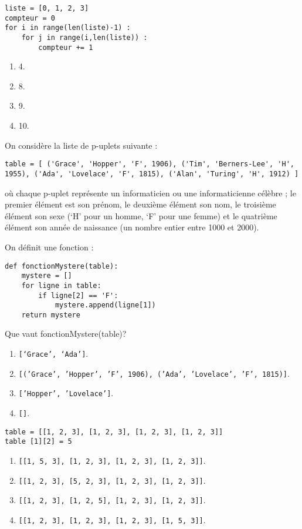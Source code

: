 \documentclass[t,10pt]{article}
\begin{document}
\begin{lstlisting}
liste = [0, 1, 2, 3]
compteur = 0
for i in range(len(liste)-1) :
    for j in range(i,len(liste)) :
        compteur += 1
\end{lstlisting}
\begin{enumerate}
\item 4.
\item 8.
\item 9. %
\item 10.
\end{enumerate}

\question{}
On considère la liste de p-uplets suivante :
\begin{lstlisting}
table = [ ('Grace', 'Hopper', 'F', 1906), ('Tim', 'Berners-Lee', 'H', 1955), ('Ada', 'Lovelace', 'F', 1815), ('Alan', 'Turing', 'H', 1912) ]
\end{lstlisting}
où chaque p-uplet représente un informaticien ou une informaticienne célèbre ; le premier élément est son prénom, le deuxième élément son nom, le troisième élément son sexe (‘H’ pour un homme, ‘F’ pour une femme) et le quatrième élément son année de naissance (un nombre entier entre 1000 et 2000).

On définit une fonction :
\begin{lstlisting}
def fonctionMystere(table):
    mystere = []
    for ligne in table:
        if ligne[2] == 'F':
            mystere.append(ligne[1])
    return mystere
\end{lstlisting}
Que vaut fonctionMystere(table)?
\begin{enumerate}
\item \texttt{[‘Grace’, ‘Ada’]}.
\item \texttt{[('Grace', 'Hopper', 'F', 1906), ('Ada', 'Lovelace', 'F', 1815)]}.
\item \texttt{['Hopper', 'Lovelace']}. %
\item \texttt{[]}.
\end{enumerate}

\begin{lstlisting}
table = [[1, 2, 3], [1, 2, 3], [1, 2, 3], [1, 2, 3]]
table [1][2] = 5
\end{lstlisting}
\begin{enumerate}
\item \texttt{[[1, 5, 3], [1, 2, 3], [1, 2, 3], [1, 2, 3]]}.
\item \texttt{[[1, 2, 3], [5, 2, 3], [1, 2, 3], [1, 2, 3]]}.
\item \texttt{[[1, 2, 3], [1, 2, 5], [1, 2, 3], [1, 2, 3]]}. %
\item \texttt{[[1, 2, 3], [1, 2, 3], [1, 2, 3], [1, 5, 3]]}.
\end{enumerate}
\end{document}
